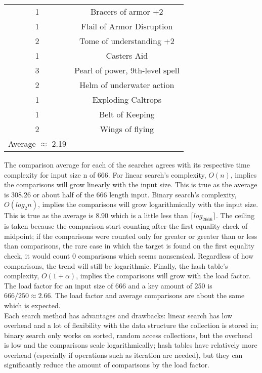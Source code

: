 \documentclass[letterpaper, 10pt]{article}
\begin{document}
\begin{center}
\begin{tabular}{|| c c ||}
    1  & Bracers of armor +2\\
    1  & Flail of Armor Disruption\\
    2  & Tome of understanding +2\\
    1  & Casters Aid\\
    3  & Pearl of power, 9th-level spell\\
    2  & Helm of underwater action\\
    1  & Exploding Caltrops\\
    1  & Belt of Keeping\\
    2  & Wings of flying\\
    \hline
    Average $\approx$ 2.19 & \\
    \hline
    \hline
    \end{tabular}
\end{center}
\newpage
\noindent
The comparison average for each of the searches agrees with its respective time complexity
for input size n of 666. For linear search's complexity, $O(n)$, implies the comparisons will grow linearly with
the input size. This is true as the average is 308.26 or about half of the 666 length input. Binary
search's complexity, $O(log_2n)$, implies the comparisons will grow logarithmically with the input size.
This is true as the average is 8.90 which is a little less than $\lceil log_2666\rceil$.
The ceiling is taken because the comparison start counting after the first equality check of midpoint;
if the comparisons were counted only for greater or greater than or less than comparisons, the rare 
case in which the target is found on the first equality check, it would count 0 comparisons which
seems nonsensical. Regardless of how comparisons, the trend will still be logarithmic. Finally,
the hash table's complexity, $O(1 + \alpha)$, implies the comparisons will grow with the load factor.
The load factor for an input size of 666 and a key amount of 250 is $666/250\approx2.66$. The load factor
and average comparisons are about the same which is expected.\\
\newline
Each search method has advantages and drawbacks: linear search has low overhead and a lot of
flexibility with the data structure the collection is stored in; binary search only works on sorted,
random access collections, but the overhead is low and the comparisons scale logarithmically;
hash tables have relatively more overhead (especially if operations such as iteration are needed),
but they can significantly reduce the amount of comparisons by the load factor.
\end{document}
